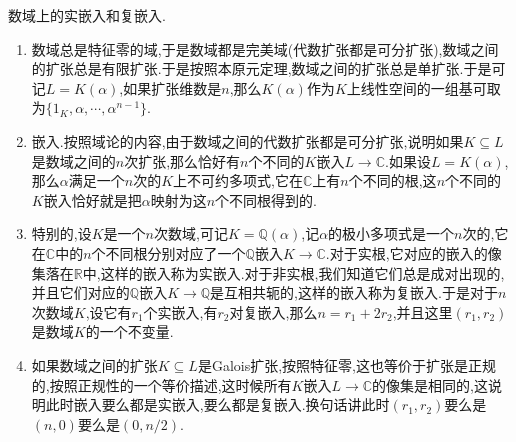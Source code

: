 数域上的实嵌入和复嵌入.
\begin{enumerate}
	\item 数域总是特征零的域,于是数域都是完美域(代数扩张都是可分扩张),数域之间的扩张总是有限扩张.于是按照本原元定理,数域之间的扩张总是单扩张.于是可记$L=K(\alpha)$,如果扩张维数是$n$,那么$K(\alpha)$作为$K$上线性空间的一组基可取为$\{1_K,\alpha,\cdots,\alpha^{n-1}\}$.
	\item 嵌入.按照域论的内容,由于数域之间的代数扩张都是可分扩张,说明如果$K\subseteq L$是数域之间的$n$次扩张,那么恰好有$n$个不同的$K$嵌入$L\to\mathbb{C}$.如果设$L=K(\alpha)$,那么$\alpha$满足一个$n$次的$K$上不可约多项式,它在$\mathbb{C}$上有$n$个不同的根,这$n$个不同的$K$嵌入恰好就是把$\alpha$映射为这$n$个不同根得到的.
	\item 特别的,设$K$是一个$n$次数域,可记$K=\mathbb{Q}(\alpha)$,记$\alpha$的极小多项式是一个$n$次的,它在$\mathbb{C}$中的$n$个不同根分别对应了一个$\mathbb{Q}$嵌入$K\to\mathbb{C}$.对于实根,它对应的嵌入的像集落在$\mathbb{R}$中,这样的嵌入称为实嵌入.对于非实根,我们知道它们总是成对出现的,并且它们对应的$\mathbb{Q}$嵌入$K\to\mathbb{Q}$是互相共轭的,这样的嵌入称为复嵌入.于是对于$n$次数域$K$,设它有$r_1$个实嵌入,有$r_2$对复嵌入,那么$n=r_1+2r_2$,并且这里$(r_1,r_2)$是数域$K$的一个不变量.
	\item 如果数域之间的扩张$K\subseteq L$是Galois扩张,按照特征零,这也等价于扩张是正规的,按照正规性的一个等价描述,这时候所有$K$嵌入$L\to\mathbb{C}$的像集是相同的,这说明此时嵌入要么都是实嵌入,要么都是复嵌入.换句话讲此时$(r_1,r_2)$要么是$(n,0)$要么是$(0,n/2)$.
\end{enumerate}

